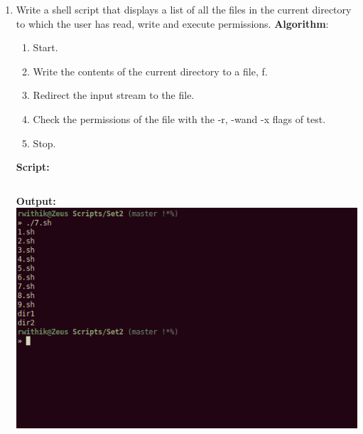 \documentclass[10pt,a4paper,titlepage]{report}
\begin{document}
\begin{enumerate}
\item Write a shell script that displays a list of all the files in the current directory to which the user has read, write and execute permissions. \newline
\textbf{Algorithm}:\newline
\begin{enumerate}
	\item Start.
	\item Write the contents of the current directory to a file, f.
	\item Redirect the input stream to the file.
	\item Check the permissions of the file with the {\color{red}-r}, {\color{red}-w}and {\color{red}-x} flags of {\color{red}test}.
	\item Stop.
\end{enumerate}
\newline
\textbf{Script:}\newline
\inputminted{bash}{../Scripts/Set2/7.sh}
\newline
\textbf{Output:}\newline
\includegraphics[width=\linewidth]{../Images/Shell2/7.png}
\pagebreak


\end{enumerate}
\end{document}
